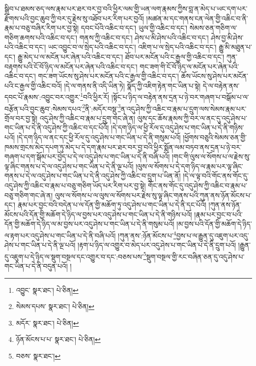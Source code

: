 སྒྲིབ་པ་ཐམས་ཅད་ལས་རྣམ་པར་ཐར་བར་བྱ་བའི་ཕྱིར་ལམ་གྱི་ཡན་ལག་རྣམས་ཀྱིས་བླ་ན་མེད་པ་ཡང་དག་པར་རྫོགས་པའི་བྱང་ཆུབ་ཀྱི་བར་དུ་རྗེས་སུ་འཐོབ་པར་རིག་པར་བྱའོ། །མཚན་མ་དང་གནས་ངན་ལེན་གྱི་འཆིང་བ་ནི་རྣམ་པ་བཅུ་བཞིར་རིག་པར་བྱ་སྟེ། དབང་པོའི་འཆིང་བ་དང་། ཡུལ་གྱི་འཆིང་བ་དང་། སེམས་ཅན་གཅིག་ལ་གཅིག་ཆགས་པའི་འཆིང་བ་དང་། གནས་ཀྱི་འཆིང་བ་དང་། ཤེས་པ་མི་ཤེས་པའི་འཆིང་བ་དང་། ཤེས་བྱ་མི་ཤེས་པའི་འཆིང་བ་དང་། ཡང་འབྱུང་བ་ལ་སྲེད་པའི་འཆིང་བ་དང་། འཇིག་པ་ལ་སྲེད་པའི་འཆིང་བ་དང་། རྒྱུ་མི་མཐུན་པ་དང་། རྒྱུ་མེད་པ་ལ་མངོན་པར་ཞེན་པའི་འཆིང་བ་དང་། ཐོབ་པར་མངོན་པའི་ང་རྒྱལ་གྱི་འཆིང་བ་དང་། ཀུན་བརྟགས་པའི་ངོ་བོ་ཉིད་ལ་མངོན་པར་ཞེན་པའི་འཆིང་བ་དང་། གང་ཟག་གི་ངོ་བོ་ཉིད་ལ་མངོན་པར་ཞེན་པའི་འཆིང་བ་དང་། གང་ཟག་ཡོངས་སུ་ཤེས་པར་མངོན་པའི་ང་རྒྱལ་གྱི་འཆིང་བ་དང་། ཆོས་ཡོངས་སུ་ཤེས་པར་མངོན་པའི་ང་རྒྱལ་གྱི་འཆིང་བའོ། །དེ་ལ་གནས་ནི་འདི་ཡིན་ཏེ། སྣོད་ཀྱི་འཇིག་རྟེན་གང་ཡིན་པ་སྟེ། དེ་ལ་བརྟེན་ནས་དབང་པོ་རྣམས་:འབྱུང་བར་འགྱུར་\footnote{འབྱུང་  སྣར་ཐང་།  པེ་ཅིན། }བའི་ཕྱིར་རོ། །སྟོང་པ་ཉིད་ལ་བརྟེན་ནས་དྲན་པ་ཉེ་བར་གཞག་པ་བསྒོམ་པ་ལ་བརྩོན་པའི་བྱང་ཆུབ་:སེམས་དཔའ་\footnote{སེམས་དཔས་  སྣར་ཐང་།  པེ་ཅིན། }ནི་:མདོར་བསྡུ་\footnote{མདོར་  སྣར་ཐང་།  པེ་ཅིན། }ན་འདུ་ཤེས་ཀྱི་འཆིང་བ་རྣམ་པ་དྲུག་ལས་སེམས་རྣམ་པར་གྲོལ་བར་བྱ་སྟེ། འདུ་ཤེས་ཀྱི་འཆིང་བ་རྣམ་པ་དྲུག་གང་ཞེ་ན། ལུས་དང་ཆོས་རྣམས་ཀྱི་བར་ལ་ནང་དུ་འདུ་ཤེས་པ་གང་ཡིན་པ་དེ་ནི་འདུ་ཤེས་ཀྱི་འཆིང་བ་དང་པོའོ། །དེ་དག་ཉིད་ལ་ཕྱི་རོལ་དུ་འདུ་ཤེས་པ་གང་ཡིན་པ་དེ་ནི་གཉིས་པའོ། །དེ་དག་ཉིད་ལ་ནང་དང་ཕྱི་རོལ་དུ་འདུ་ཤེས་པ་གང་ཡིན་པ་དེ་ནི་གསུམ་པའོ། །ཕྱོགས་བཅུའི་སེམས་ཅན་གྱི་ཁམས་གྲངས་མེད་དཔག་ཏུ་མེད་པ་དེ་དག་རྣམ་པར་ཐར་བར་བྱ་བའི་ཕྱིར་སྨོན་ལམ་བཏབ་ནས་དྲན་པ་ཉེ་བར་གཞག་པ་དག་སྒོམ་པར་བྱེད་པ་དེ་ལ་འདུ་ཤེས་པ་གང་ཡིན་པ་དེ་ནི་བཞི་པའོ། །གང་གི་ལུས་ལ་སོགས་པ་ལ་རྗེས་སུ་ལྟ་ཞིང་གནས་པ་དེ་ལ་འདུ་ཤེས་པ་གང་ཡིན་པ་དེ་ནི་ལྔ་པའོ། །ལུས་ལ་སོགས་པ་དེ་དག་ཉིད་ལ་རྣམ་པར་ལྟ་ཞིང་གནས་པ་དེ་ལ་འདུ་ཤེས་པ་གང་ཡིན་པ་དེ་ནི་འདུ་ཤེས་ཀྱི་འཆིང་བ་དྲུག་པ་ཡིན་ནོ། །དེ་ལ་ལྟ་བའི་གོང་ནས་གོང་དུ་འདུ་ཤེས་ཀྱི་འཆིང་བ་རྣམ་པ་བཅུ་གཅིག་ཡོད་པར་རིག་པར་བྱ་སྟེ། གོང་ནས་གོང་དུ་འདུ་ཤེས་ཀྱི་འཆིང་བ་རྣམ་པ་བཅུ་གཅིག་གང་ཞེ་ན། ལུས་ལ་སོགས་པ་ལ་ལུས་ལ་སོགས་པར་རྗེས་སུ་ལྟ་ཞིང་གནས་པའི་ཀུན་ནས་ཉོན་མོངས་པ་དང་། རྣམ་པར་བྱང་བའི་བདེན་པ་ལ་དོན་གྱི་མཆོག་ཏུ་འདུ་ཤེས་པ་གང་ཡིན་པ་དེ་ནི་དང་པོའོ། །ཀུན་ནས་ཉོན་མོངས་པའི་དོན་གྱི་མཆོག་དེ་ཉིད་ལ་བྱས་པར་འདུ་ཤེས་པ་གང་ཡིན་པ་དེ་ནི་གཉིས་པའོ། །རྣམ་པར་བྱང་བ་པའི་དོན་གྱི་མཆོག་དེ་ཉིད་ལ་མ་བྱས་པར་འདུ་ཤེས་པ་གང་ཡིན་པ་དེ་ནི་གསུམ་པའོ། །མ་བྱས་པའི་དོན་གྱི་མཆོག་དེ་ཉིད་ལ་རྟག་པར་འདུ་ཤེས་པ་གང་ཡིན་པ་དེ་ནི་བཞི་པའོ། །ཀུན་ནས་:ཉོན་མོངས་པ་\footnote{ཉོན་མོངས་པ་པ་  སྣར་ཐང་།  པེ་ཅིན། }བྱས་པ་ལ་རྒྱུན་དུ་འཇུག་པར་འདུ་ཤེས་པ་གང་ཡིན་པ་དེ་ནི་ལྔ་པའོ། །རྟག་པ་ཉིད་ལ་འགྱུར་བ་མེད་པར་འདུ་ཤེས་པ་གང་ཡིན་པ་དེ་ནི་དྲུག་པའོ། །རྒྱུན་དུ་འཇུག་པ་དེ་ཉིད་ལ་སྡུག་བསྔལ་དང་འགྱུར་བ་དང་:བཅས་པས་\footnote{བཅས་  སྣར་ཐང་། }སྡུག་བསྔལ་གྱི་རང་བཞིན་ཅན་དུ་འདུ་ཤེས་པ་གང་ཡིན་པ་དེ་ནི་བདུན་པའོ། །
